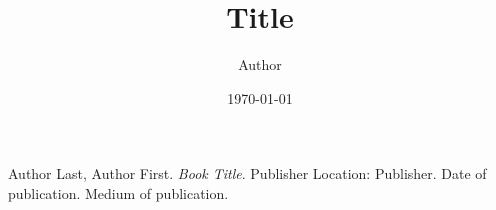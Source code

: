 \documentclass[letterpaper, 12pt]{article}
\title{Title}
\author{Author}
\date{\today}
\begin{document}
\maketitle



\begin{workscited} %
\bibent
	Author Last, Author First. \textit{Book Title}. Publisher Location: Publisher. Date of publication. Medium of publication.
\end{workscited}
\end{document}
